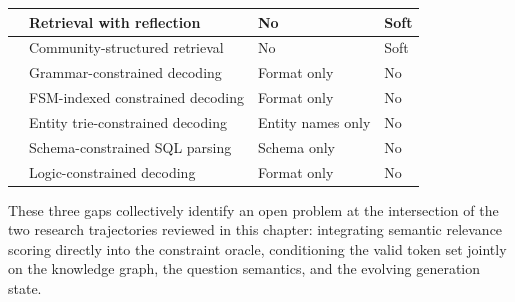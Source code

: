\begin{longtable}[htpb]{|>{\raggedright\arraybackslash}p{3.5cm}|>{\raggedright\arraybackslash}p{4cm}|>{\raggedright\arraybackslash}p{3cm}|>{\raggedright\arraybackslash}p{3cm}|}
  \citet{asai2024selfrag}                     & Retrieval with reflection        & No                               & Soft                           \\ \hline
  \citet{edge2024graphrag}                    & Community-structured retrieval   & No                               & Soft                           \\ \hline
  \citet{geng2023grammarconstrained}          & Grammar-constrained decoding     & Format only                      & No                             \\ \hline
  \citet{willard2023outlines}                 & FSM-indexed constrained decoding & Format only                      & No                             \\ \hline
  \citet{decao2021autoregressive}             & Entity trie-constrained decoding & Entity names only                & No                             \\ \hline
  \citet{scholak2021picard}                   & Schema-constrained SQL parsing   & Schema only                      & No                             \\ \hline
  \citet{lu2021neurologic}                    & Logic-constrained decoding       & Format only                      & No                             \\
\end{longtable}

These three gaps collectively identify an open problem at the intersection of the two research trajectories reviewed in this chapter: integrating semantic relevance scoring directly into the constraint oracle, conditioning the valid token set jointly on the knowledge graph, the question semantics, and the evolving generation state.
